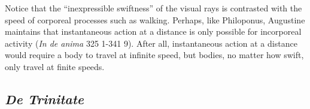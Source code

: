 \documentclass[12pt]{article}
\begin{document}
Notice that the ``inexpressible swiftness'' of the visual rays is contrasted with the speed of corporeal processes such as walking. Perhaps, like Philoponus, Augustine maintains that instantaneous action at a distance is only possible for incorporeal activity (\emph{In de anima} 325 1-341 9). After all, instantaneous action at a distance would require a body to travel at infinite speed, but bodies, no matter how swift, only travel at finite speeds. 




\subsection{\emph{De Trinitate}} %
\label{sub:_emph_de_trinitate}
\end{document}
